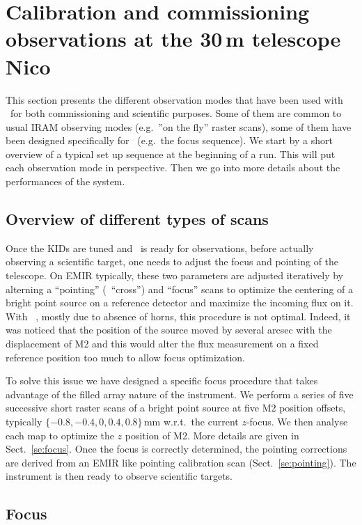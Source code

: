 
\section{Calibration and commissioning observations at the 30\,m telescope {\color{YellowGreen} Nico}}

This section presents the different observation modes that have been used with
\nika\ for both commissioning and scientific purposes. Some of them are common
to usual IRAM observing modes (e.g.~''on the fly'' raster scans), some of them
have been designed specifically for \nika\ (e.g.~the focus sequence). We start
by a short overview of a typical set up sequence at the beginning of a run. This
will put each observation mode in perspective. Then we go into more details
about the performances of the system.

\subsection{Overview of different types of scans}

Once the KIDs are tuned and \nika\ is ready for observations, before actually
observing a scientific target, one needs to adjust the focus and pointing of the
telescope. On EMIR typically, these two parameters are adjusted iteratively by
alterning a ``pointing'' (\aka\ ``cross'') and ``focus'' scans to optimize the
centering of a bright point source on a reference detector and maximize the
incoming flux on it. With \nika\ , mostly due to absence of horns, this
procedure is not optimal. Indeed, it was noticed that the position of the source
moved by several arcsec with the displacement of M2 and this would alter the flux
measurement on a fixed reference position too much to allow focus
optimization.

To solve this issue we have designed a specific focus procedure that takes
advantage of the filled array nature of the instrument. We perform a series of
five successive short raster scans of a bright point source at five M2 position
offsets, typically $\{-0.8, -0.4, 0, 0.4, 0.8\}$\,mm w.r.t.~the current
$z$-focus. We then analyse each map to optimize the $z$ position of M2. More
details are given in Sect.~\ref{se:focus}. Once the focus is correctly
determined, the pointing corrections are derived from an EMIR like pointing
calibration scan (Sect.~\ref{se:pointing}). The instrument is then ready to
observe scientific targets.

\subsection{Focus}

